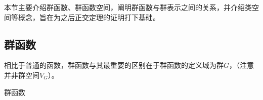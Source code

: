 
\begin{issues}
\issueDraft
\issueTODO
\end{issues}

本节主要介绍群函数、群函数空间，阐明群函数与群表示之间的关系，并介绍类空间等概念，旨在为之后正交定理的证明打下基础。

\subsection{群函数}

相比于普通的函数，群函数与其最重要的区别在于群函数的定义域为群$G$，（注意并非群空间$V_G$）。
\begin{definition}{群函数}

\end{definition}